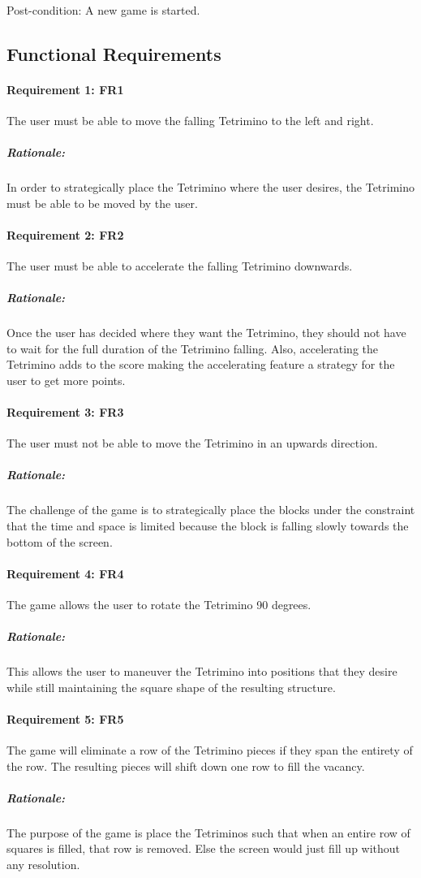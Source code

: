 \documentclass[12pt, titlepage]{article}
\begin{document}
\paragraph{}
Post-condition: A new game is started.

\subsection{Functional Requirements}

\paragraph{Requirement 1: FR1}
The user must be able to move the falling Tetrimino to the left and right.
\subparagraph{Rationale:}
In order to strategically place the Tetrimino where the user desires, the Tetrimino must be able to be moved by the user.

\paragraph{Requirement 2: FR2}
The user must be able to accelerate the falling Tetrimino downwards.
\subparagraph{Rationale:}
Once the user has decided where they want the Tetrimino, they should not have to wait for the full duration of the Tetrimino falling. Also, accelerating the Tetrimino adds to the score making the accelerating feature a strategy for the user to get more points.

\paragraph{Requirement 3: FR3}
The user must not be able to move the Tetrimino in an upwards direction.
\subparagraph{Rationale:}
The challenge of the game is to strategically place the blocks under the constraint that the time and space is limited because the block is falling slowly towards the bottom of the screen.

\paragraph{Requirement 4: FR4}
The game allows the user to rotate the Tetrimino 90 degrees.
\subparagraph{Rationale:}
This allows the user to maneuver the Tetrimino into positions that they desire while still maintaining the square shape of the resulting structure.

\paragraph{Requirement 5: FR5}
The game will eliminate a row of the Tetrimino pieces if they span the entirety of the row. The resulting pieces will shift down one row to fill the vacancy.
\subparagraph{Rationale:}
The purpose of the game is place the Tetriminos such that when an entire row of squares is filled, that row is removed. Else the screen would just fill up without any resolution.
\end{document}

